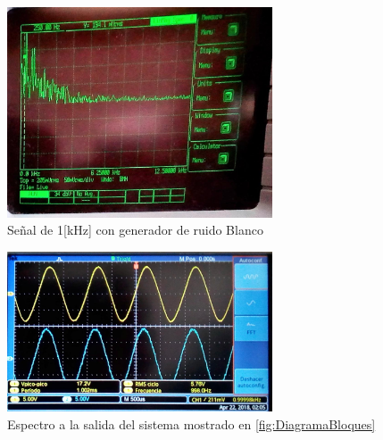 \documentclass{article}
\begin{document}

  

   

\begin{figure}[h!]
    \centering
    \includegraphics[width=0.7\textwidth]{Imagenes/RuidoSenoEspectros.jpg}
    
    \caption{Señal de 1[kHz] con generador de ruido Blanco}
    \label{fig:ruidoSenoEspectros}
\end{figure}

\begin{figure}[h!]
    \centering
    \includegraphics[width=0.7\textwidth]{Imagenes/RuidoSenoFiltro.jpg}
   
    \caption{Espectro a la salida del sistema mostrado en \ref{fig:DiagramaBloques}}
    \label{fig:ruidoSenoFiltro}
\end{figure}
\end{document}
